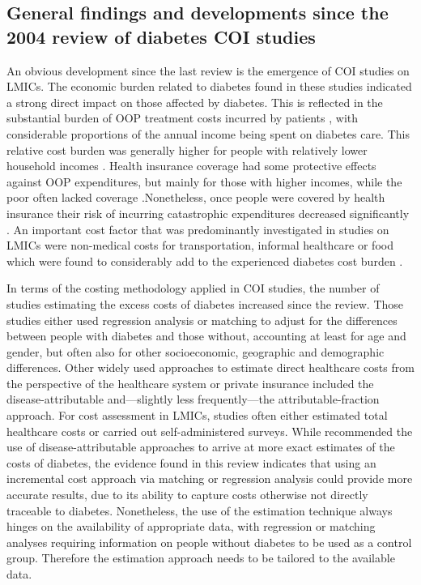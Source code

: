 \subsection{General findings and developments since the 2004 review of diabetes COI studies}
An obvious development since the last review is the emergence of \ac{COI} studies on \acp{LMIC}. The economic burden related to diabetes found in these studies indicated a strong direct impact on those affected by diabetes. This is reflected in the substantial burden of \ac{OOP} treatment costs incurred by patients \parencite{Smith-Spangler2012,Suleiman2006,Arredondo2007,Esteghamati2009,Wang2009b,Ramachandran2007d,Khowaja2007a,Elrayah-Eliadarous2010b,Chatterjee2011c,Tharkar2010a,Wang2010c}, with considerable proportions of the annual income being spent on diabetes care. This relative cost burden was generally higher for people with relatively lower household incomes \parencite{Ramachandran2007d,Khowaja2007a,Tharkar2010a}. Health insurance coverage had some protective effects against \ac{OOP} expenditures, but mainly for those with higher incomes, while the poor often lacked coverage \parencite{Ramachandran2007d,Khowaja2007a,Tharkar2010a}.Nonetheless, once people were covered by health insurance their risk of incurring catastrophic expenditures decreased significantly \parencite{Smith-Spangler2012}. An important cost factor that was predominantly investigated in studies on \acp{LMIC} were non-medical costs for transportation, informal healthcare or food which were found to considerably add to the experienced diabetes cost burden \parencite{Esteghamati2009,Wang2009b,Wang2009f,Chatterjee2011c,Tharkar2010a}.

In terms of the costing methodology applied in \ac{COI} studies, the number of studies estimating the excess costs of diabetes increased since the \textcite{Ettaro2004} review. Those studies either used regression analysis or matching to adjust for the differences between people with diabetes and those without, accounting at least for age and gender, but often also for other socioeconomic, geographic and demographic differences. Other widely used approaches to estimate direct healthcare costs from the perspective of the healthcare system or private insurance included the disease-attributable and---slightly less frequently---the attributable-fraction approach. For cost assessment in \acp{LMIC}, studies often either estimated total healthcare costs or carried out self-administered surveys. While \textcite{Ettaro2004} recommended the use of disease-attributable approaches to arrive at more exact estimates of the costs of diabetes, the evidence found in this review indicates that using an incremental cost approach via matching or regression analysis could provide more accurate results, due to its ability to capture costs otherwise not directly traceable to diabetes. Nonetheless, the use of the estimation technique always hinges on the availability of appropriate data, with regression or matching analyses requiring information on people without diabetes to be used as a control group. Therefore the estimation approach needs to be tailored to the available data. 

